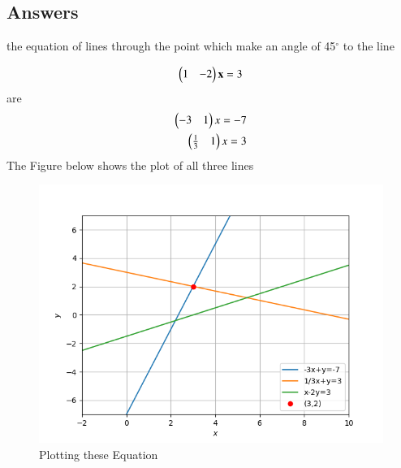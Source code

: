 \documentclass[journal,12pt,twocolumn]{IEEEtran}
\begin{document}
\subsection{Answers}
the equation of lines through the point   which make an angle of 45$^{\circ}$ to the line

\begin{align}
\begin{pmatrix}1 & -2\end{pmatrix}\mathbf{x} = 3 
\end{align}
are
\begin{align}
   \begin{pmatrix}-3 & 1\end{pmatrix}x=-7\\ 
   \begin{pmatrix}\frac{1}{3} & 1\end{pmatrix}x=3
\end{align}
The Figure below shows the plot of all three lines
\begin{figure}[!ht]
\centering
\includegraphics[width=\columnwidth]{Edit_plot.png}
\caption{Plotting these Equation}
\end{figure}
\end{document}
